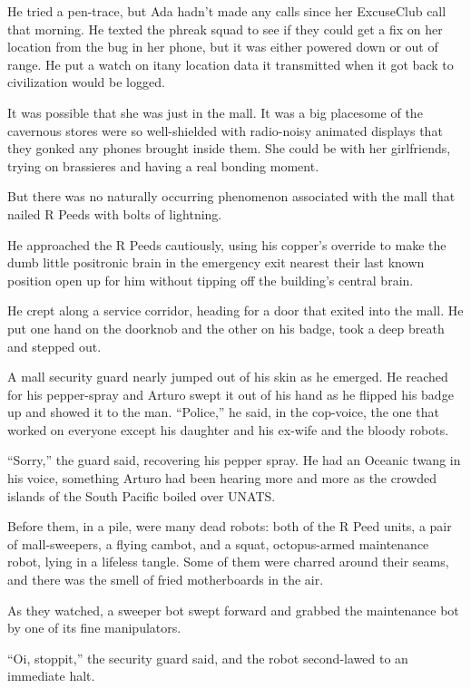 He tried a pen-trace, but Ada hadn’t made any calls since her
ExcuseClub call that morning. He texted the phreak squad to see if
they could get a fix on her location from the bug in her phone, but
it was either powered down or out of range. He put a watch on
it{\dash}any location data it transmitted when it got back to
civilization would be logged.

It was possible that she was just in the mall. It was a big
place{\dash}some of the cavernous stores were so well-shielded with
radio-noisy animated displays that they gonked any phones brought
inside them. She could be with her girlfriends, trying on
brassieres and having a real bonding moment.

But there was no naturally occurring phenomenon associated with the
mall that nailed R Peeds with bolts of lightning.

\tb

He approached the R Peeds cautiously, using his copper’s override
to make the dumb little positronic brain in the emergency exit
nearest their last known position open up for him without tipping
off the building’s central brain.

He crept along a service corridor, heading for a door that exited
into the mall. He put one hand on the doorknob and the other on his
badge, took a deep breath and stepped out.

A mall security guard nearly jumped out of his skin as he emerged.
He reached for his pepper-spray and Arturo swept it out of his hand
as he flipped his badge up and showed it to the man. “Police,” he
said, in the cop-voice, the one that worked on everyone except his
daughter and his ex-wife and the bloody robots.

“Sorry,” the guard said, recovering his pepper spray. He had an
Oceanic twang in his voice, something Arturo had been hearing more
and more as the crowded islands of the South Pacific boiled over
UNATS.

Before them, in a pile, were many dead robots: both of the R Peed
units, a pair of mall-sweepers, a flying cambot, and a squat,
octopus-armed maintenance robot, lying in a lifeless tangle. Some
of them were charred around their seams, and there was the smell of
fried motherboards in the air.

As they watched, a sweeper bot swept forward and grabbed the
maintenance bot by one of its fine manipulators.

“Oi, stoppit,” the security guard said, and the robot second-lawed
to an immediate halt.

